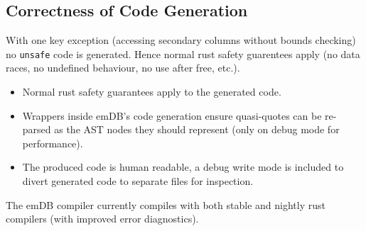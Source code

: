 \subsection{Correctness of Code Generation}
With one key exception (accessing secondary columns without bounds checking) no \texttt{unsafe} code is generated. Hence normal rust safety guarentees apply (no data races, no undefined behaviour, no use after free, etc.).
\begin{itemize}
    \setlength\itemsep{0em}
    \item Normal rust safety guarantees apply to the generated code.
    \item Wrappers inside emDB's code generation ensure quasi-quotes can be re-parsed as the AST nodes they should represent (only on debug mode for performance).
    \item The produced code is human readable, a debug write mode is included to divert generated code to separate files for inspection.
\end{itemize}

The emDB compiler currently compiles with both stable and nightly rust compilers (with improved error diagnostics).


